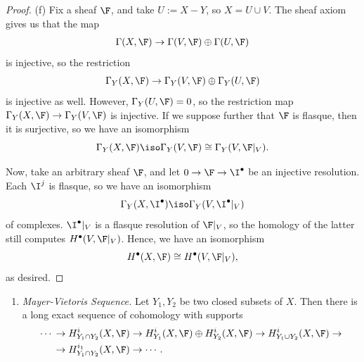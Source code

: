 \documentclass[12pt]{amsart}
\begin{document}
\begin{proof}
  (f) Fix a sheaf $\F$, and take $U:=X-Y$, so $X=U\cup V$.
  The sheaf axiom gives us that the map
  \begin{align*}
    \Gamma(X,\F)\to \Gamma(V,\F)\oplus \Gamma(U,\F)
  \end{align*}
  is injective, so the restriction
  \[
    \Gamma_Y(X,\F)\to \Gamma_Y(V,\F)\oplus \Gamma_Y(U,\F)
  \] 
  is injective as well.
  However, $\Gamma_Y(U,\F)=0$, so the restriction map $\Gamma_Y(X,\F)\to \Gamma_Y(V,\F)$ is injective.
  If we suppose further that $\F$ is flasque, then it is surjective, so we have an isomorphism
  \[
    \Gamma_Y(X,\F) \iso \Gamma_Y(V,\F)\cong \Gamma_Y(V,\F|_V).
  \] 

  Now, take an arbitrary sheaf $\F$, and let $0\to \F\to \I^\bullet$ be an injective resolution.
  Each $\I^j$ is flasque, so we have an isomorphism
  \[
    \Gamma_Y(X,\I^\bullet)\iso \Gamma_Y(V,\I^\bullet|_V)
  \] 
  of complexes.
  $\I^\bullet|_V$ is a flasque resolution of $\F|_V$, so the homology of the latter still computes $H^\bullet(V,\F|_V)$.
  Hence, we have an isomorphism
  \[
    H^\bullet(X,\F)\cong H^\bullet(V,\F|_V),
  \] 
  as desired.
\end{proof}

\begin{enumerate}
  \item[8.4.] {
      \emph{Mayer-Vietoris Sequence.} 
      Let $Y_1,Y_2$ be two closed subsets of $X$.
      Then there is a long exact sequence of cohomology with supports
      \begin{align*}
        \cdots\,&\to H_{Y_1\cap Y_2}^i(X,\F) \to H_{Y_1}^i(X,\F)\oplus H_{Y_2}^i(X,\F)\to H_{Y_1\cup Y_2}^i(X,\F) \to \\
        &\to H_{Y_1\cap Y_2}^{i_1}(X,\F)\to \cdots.
      \end{align*}
    }
\end{enumerate}
\end{document}
